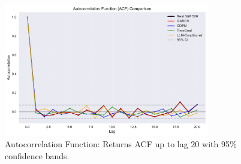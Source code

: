 \begin{figure}[htbp]
\centering
\includegraphics[width=0.8\textwidth]{figures/acf_comparison.pdf}
\caption{Autocorrelation Function: Returns ACF up to lag 20 with 95\% confidence bands.}
\label{fig:acf_comparison}
\end{figure}